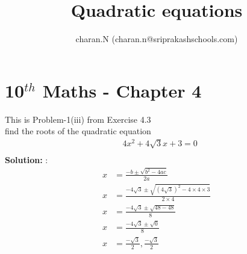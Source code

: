 \documentclass[12pt]{article}
\title{Quadratic equations}
\author{charan.N (charan.n@sriprakashschools.com)}
\newcommand{\solution}{\noindent \textbf{Solution: }}
\begin{document}
\maketitle
\section*{10$^{th}$ Maths - Chapter 4}
This is Problem-1(iii) from Exercise 4.3\\
find the roots of the quadratic equation\\
\begin{align}
&{4}x^2+4\sqrt{3} x +{3} = 0\\
\end{align}
\solution:\\
\begin{align}
x &=\frac{-b\pm\sqrt{b^2-4ac}}{2a}\\
x &=\frac{-4\sqrt{3} \pm\sqrt{(4\sqrt{3} )^2-4 \times 4\times3}}{2 \times 4}\\
x &=\frac{-4\sqrt{3} \pm\sqrt{48-48}}{8}\\
x &=\frac{-4\sqrt{3}\pm\sqrt{0}}{8}\\
x &=\frac{-\sqrt{3}}{2},\frac{-\sqrt{3}}{2}\\
\end{align}
\end{document}

